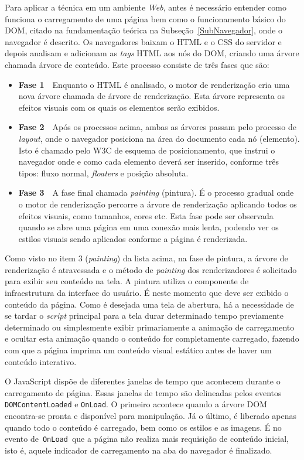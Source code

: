 Para aplicar a técnica em um ambiente \textit{Web}, antes é necessário entender como funciona o carregamento de uma página bem como o funcionamento básico do DOM, citado na fundamentação teórica na Subseção~\ref{SubNavegador}, onde o navegador é descrito. Os navegadores baixam o HTML e o CSS do servidor e depois analisam e adicionam as \textit{tags} HTML aos nós do DOM, criando uma árvore chamada árvore de conteúdo. Este processo consiste de três fases que são:
\begin{itemize}
    \item \textbf{Fase 1}~\textemdash~Enquanto o HTML é analisado, o motor de renderização cria uma nova árvore chamada de árvore de renderização. Esta árvore representa os efeitos visuais com os quais os elementos serão exibidos.
    \item \textbf{Fase 2}~\textemdash~Após os processos acima, ambas as árvores passam pelo processo de \textit{layout}, onde o navegador posiciona na área do documento cada nó (elemento). Isto é chamado pelo W3C de esquema de posicionamento, que instrui o navegador onde e como cada elemento deverá ser inserido, conforme três tipos: fluxo normal, \textit{floaters} e posição absoluta.
    \item \textbf{Fase 3}~\textemdash~A fase final chamada \textit{painting} (pintura). É o processo gradual onde o motor de renderização percorre a árvore de renderização aplicando todos os efeitos visuais, como tamanhos, cores etc. Esta fase pode ser observada quando se abre uma página em uma conexão mais lenta, podendo ver os estilos visuais sendo aplicados conforme a página é renderizada.
\end{itemize}

Como visto no item 3 (\textit{painting}) da lista acima, na fase de pintura, a árvore de renderização é atravessada e o método de \textit{painting} dos renderizadores é solicitado para exibir seu conteúdo na tela. A pintura utiliza o componente de infraestrutura da interface do usuário. É neste momento que deve ser exibido o conteúdo da página. Como é desejada uma tela de abertura, há a necessidade de se tardar o \textit{script} principal para a tela durar determinado tempo previamente determinado ou simplesmente exibir primariamente a animação de carregamento e ocultar esta animação quando o conteúdo for completamente carregado, fazendo com que a página imprima um conteúdo visual estático antes de haver um conteúdo interativo.

O JavaScript dispõe de diferentes janelas de tempo que acontecem durante o carregamento de página. Essas janelas de tempo são delineadas pelos eventos \texttt{DOMContentLoaded} e \texttt{OnLoad}. O primeiro acontece quando a árvore DOM encontra-se pronta e disponível para manipulação. Já o último, é liberado apenas quando todo o conteúdo é carregado, bem como os estilos e as imagens. É no evento de~\texttt{OnLoad}~que a página não realiza mais requisição de conteúdo inicial, isto é, aquele indicador de carregamento na aba do navegador é finalizado.
%
%
%
